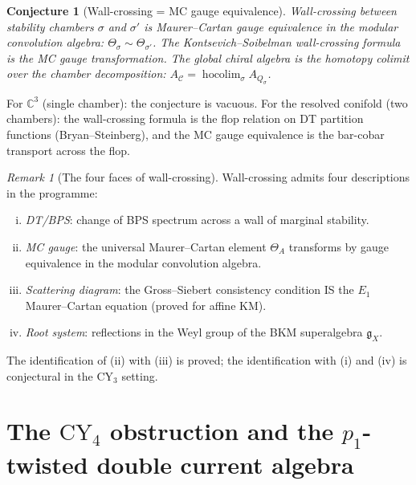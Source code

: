 \documentclass[11pt]{article}
\theoremstyle{plain}
\newtheorem{conjecture}[theorem]{Conjecture}
\theoremstyle{definition}
\theoremstyle{remark}
\newtheorem{remark}[theorem]{Remark}
\newcommand{\fg}{\mathfrak{g}}
\newcommand{\cC}{\mathcal{C}}
\newcommand{\bC}{\mathbb{C}}
\newcommand{\Eone}{E_1}
\newcommand{\CY}{\mathrm{CY}}
\begin{document}
\begin{conjecture}[Wall-crossing = MC gauge equivalence]
\label{conj:v3-qg-wall-crossing-mc}
Wall-crossing between stability chambers $\sigma$ and $\sigma'$ is
Maurer--Cartan gauge equivalence in the modular convolution algebra:
$\Theta_\sigma \sim \Theta_{\sigma'}$.  The Kontsevich--Soibelman
wall-crossing formula is the MC gauge transformation.  The global
chiral algebra is the homotopy colimit over the chamber
decomposition:
$A_\cC = \operatorname{hocolim}_\sigma A_{Q_\sigma}$.
\end{conjecture}

For $\bC^3$ (single chamber): the conjecture is vacuous.  For the
resolved conifold (two chambers): the wall-crossing formula is the
flop relation on DT partition functions (Bryan--Steinberg), and the
MC gauge equivalence is the bar-cobar transport across the flop.

\begin{remark}[The four faces of wall-crossing]
\label{rem:v3-qg-four-faces-wc}
Wall-crossing admits four descriptions in the programme:
\begin{enumerate}[(i)]
 \item \emph{DT/BPS}: change of BPS spectrum across a wall of
 marginal stability.
 \item \emph{MC gauge}: the universal Maurer--Cartan element
 $\Theta_A$ transforms by gauge equivalence in the modular
 convolution algebra.
 \item \emph{Scattering diagram}: the Gross--Siebert consistency
 condition IS the $\Eone$ Maurer--Cartan equation (proved for
 affine KM).
 \item \emph{Root system}: reflections in the Weyl group of the
 BKM superalgebra $\fg_X$.
\end{enumerate}
The identification of (ii) with (iii) is proved; the identification
with (i) and (iv) is conjectural in the CY$_3$ setting.
\end{remark}



\section{The $\CY_4$ obstruction and the $p_1$-twisted double
current algebra}
\label{sec:cy4-p1-twisted}
\end{document}
